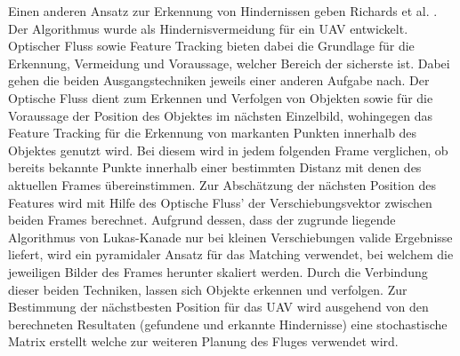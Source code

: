 \noindent
Einen anderen Ansatz zur Erkennung von Hindernissen geben Richards et al. \cite{richards2014obstacle} . Der Algorithmus wurde als Hindernisvermeidung für ein UAV entwickelt. Optischer Fluss sowie Feature Tracking bieten dabei die Grundlage für die Erkennung, Vermeidung und Voraussage, welcher Bereich der sicherste ist. Dabei gehen die beiden Ausgangstechniken jeweils einer anderen Aufgabe nach. 
Der Optische Fluss dient zum Erkennen und Verfolgen von Objekten sowie für die Voraussage der Position des Objektes im nächsten Einzelbild, wohingegen das Feature Tracking \cite{shi1994good} für die Erkennung von markanten Punkten innerhalb des Objektes genutzt wird. Bei diesem wird in jedem folgenden Frame verglichen, ob bereits bekannte Punkte innerhalb einer bestimmten Distanz mit denen des aktuellen Frames übereinstimmen. Zur Abschätzung der nächsten Position des Features wird mit Hilfe des Optische Fluss’ der  Verschiebungsvektor zwischen beiden Frames berechnet. Aufgrund dessen, dass der zugrunde liegende Algorithmus von Lukas-Kanade \cite{lucas1981iterative} nur bei kleinen Verschiebungen valide Ergebnisse liefert, wird ein pyramidaler Ansatz \cite{bouguet2001pyramidal} für das Matching verwendet, bei welchem die jeweiligen Bilder des Frames herunter skaliert werden. Durch die Verbindung dieser beiden Techniken, lassen sich Objekte erkennen und verfolgen. Zur Bestimmung der nächstbesten Position für das UAV wird ausgehend von den berechneten Resultaten (gefundene und erkannte Hindernisse) eine stochastische Matrix erstellt welche zur weiteren Planung des Fluges verwendet wird.\\

